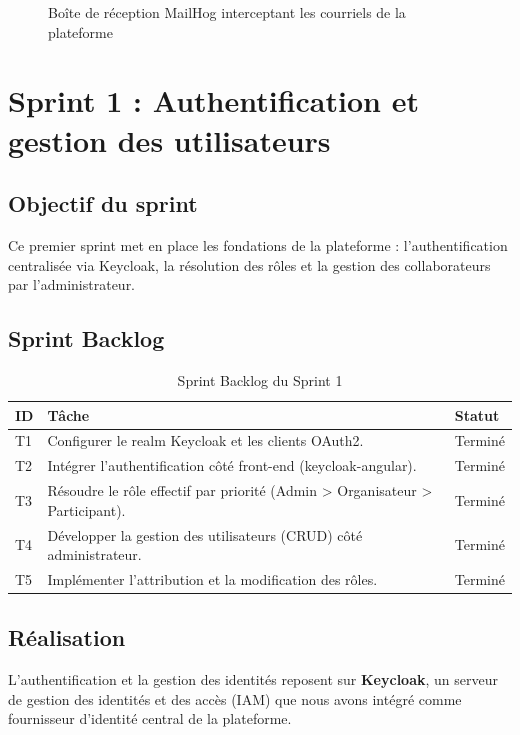 \begin{figure}[H]\centering
  \caption{Boîte de réception MailHog interceptant les courriels de la plateforme}\label{fig:env-mailhog}
\end{figure}

\section{Sprint 1 : Authentification et gestion des utilisateurs}

\subsection{Objectif du sprint}
Ce premier sprint met en place les fondations de la plateforme : l'authentification
centralisée via Keycloak, la résolution des rôles et la gestion des collaborateurs par
l'administrateur.

\subsection{Sprint Backlog}
\begin{table}[H]\centering\renewcommand{\arraystretch}{1.25}
\begin{tabular}{|p{1cm}|p{10.5cm}|p{1.6cm}|}\hline
\rowcolor{gray!15}\textbf{ID} & \textbf{Tâche} & \textbf{Statut} \\ \hline
T1 & Configurer le realm Keycloak et les clients OAuth2. & Terminé \\ \hline
T2 & Intégrer l'authentification côté front-end (keycloak-angular). & Terminé \\ \hline
T3 & Résoudre le rôle effectif par priorité (Admin > Organisateur > Participant). & Terminé \\ \hline
T4 & Développer la gestion des utilisateurs (CRUD) côté administrateur. & Terminé \\ \hline
T5 & Implémenter l'attribution et la modification des rôles. & Terminé \\ \hline
\end{tabular}
\caption{Sprint Backlog du Sprint 1}\label{tab:sb1}
\end{table}

\subsection{Réalisation}
L'authentification et la gestion des identités reposent sur \textbf{Keycloak}, un serveur
de gestion des identités et des accès (IAM) que nous avons intégré comme fournisseur
d'identité central de la plateforme.

